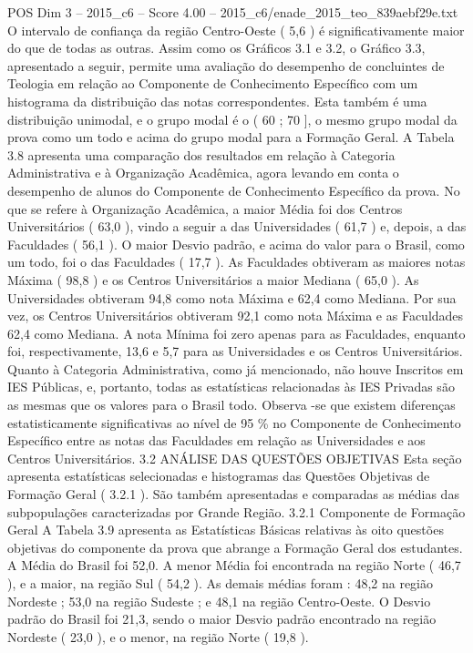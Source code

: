 \begin{textsample}{POS Dim 3 – 2015\_c6 – Score 4.00 – 2015\_c6/enade\_2015\_teo\_839aebf29e.txt}
O intervalo de confiança da região Centro-Oeste ( 5,6 ) é significativamente maior do que de todas as outras.
Assim como os Gráficos 3.1 e 3.2, o Gráfico 3.3, apresentado a seguir, permite uma avaliação do desempenho de concluintes de Teologia em relação ao Componente de Conhecimento Específico com um histograma da distribuição das notas correspondentes.
Esta também é uma distribuição unimodal, e o grupo modal é o ( 60 ; 70 ], o mesmo grupo modal da prova como um todo e acima do grupo modal para a Formação Geral.
A Tabela 3.8 apresenta uma comparação dos resultados em relação à Categoria Administrativa e à Organização Acadêmica, agora levando em conta o desempenho de alunos do Componente de Conhecimento Específico da prova.
No que se refere à Organização Acadêmica, a maior Média foi dos Centros Universitários ( 63,0 ), vindo a seguir a das Universidades ( 61,7 ) e, depois, a das Faculdades ( 56,1 ).
O maior Desvio padrão, e acima do valor para o Brasil, como um todo, foi o das Faculdades ( 17,7 ).
As Faculdades obtiveram as maiores notas Máxima ( 98,8 ) e os Centros Universitários a maior Mediana ( 65,0 ).
As Universidades obtiveram 94,8 como nota Máxima e 62,4 como Mediana.
Por sua vez, os Centros Universitários obtiveram 92,1 como nota Máxima e as Faculdades 62,4 como Mediana.
A nota Mínima foi zero apenas para as Faculdades, enquanto foi, respectivamente, 13,6 e 5,7 para as Universidades e os Centros Universitários.
Quanto à Categoria Administrativa, como já mencionado, não houve Inscritos em IES Públicas, e, portanto, todas as estatísticas relacionadas às IES Privadas são as mesmas que os valores para o Brasil todo.
Observa -se que existem diferenças estatisticamente significativas ao nível de 95 \% no Componente de Conhecimento Específico entre as notas das Faculdades em relação as Universidades e aos Centros Universitários. 3.2 ANÁLISE DAS QUESTÕES OBJETIVAS Esta seção apresenta estatísticas selecionadas e histogramas das Questões Objetivas de Formação Geral ( 3.2.1 ).
São também apresentadas e comparadas as médias das subpopulações caracterizadas por Grande Região. 3.2.1 Componente de Formação Geral A Tabela 3.9 apresenta as Estatísticas Básicas relativas às oito questões objetivas do componente da prova que abrange a Formação Geral dos estudantes.
A Média do Brasil foi 52,0.
A menor Média foi encontrada na região Norte ( 46,7 ), e a maior, na região Sul ( 54,2 ).
As demais médias foram : 48,2 na região Nordeste ; 53,0 na região Sudeste ; e 48,1 na região Centro-Oeste.
O Desvio padrão do Brasil foi 21,3, sendo o maior Desvio padrão encontrado na região Nordeste ( 23,0 ), e o menor, na região Norte ( 19,8 ).

\end{textsample}

